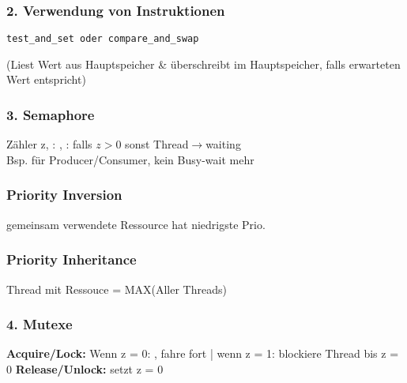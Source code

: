 \subsubsection{2. Verwendung von Instruktionen}
\begin{verbatim}
test_and_set oder compare_and_swap 
\end{verbatim}
(Liest Wert aus Hauptspeicher \& überschreibt im Hauptspeicher, falls erwarteten Wert entspricht)
\subsubsection{3. Semaphore}
Zähler z, : , :  falls $z>0$ sonst Thread$\rightarrow$waiting\\
Bsp. für Producer/Consumer, kein Busy-wait mehr


\subsubsection{Priority Inversion}
gemeinsam verwendete Ressource hat niedrigste Prio.

\subsubsection{Priority Inheritance}
Thread mit Ressouce = MAX(Aller Threads)

\subsubsection{4. Mutexe}
\textbf{Acquire/Lock:} Wenn z = 0: , fahre fort |
wenn z = 1: blockiere Thread bis z = 0
\textbf{Release/Unlock:} setzt z = 0

